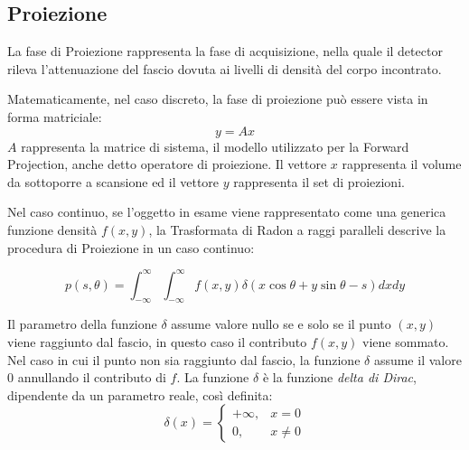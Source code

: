 \documentclass[a4paper,12pt, doubleside]{report}
\begin{document}
            \subsection{Proiezione}
                \par
                    La fase di Proiezione rappresenta la fase di acquisizione, nella quale il detector rileva l'attenuazione del fascio dovuta ai livelli di densità del corpo incontrato.
                \par
                    Matematicamente, nel caso discreto, la fase di proiezione può essere vista in forma matriciale:
                    \begin{equation}
                        y = Ax
                    \end{equation}
                    $A$ rappresenta la matrice di sistema, il modello utilizzato per la Forward Projection, anche detto operatore di proiezione. Il vettore $x$ rappresenta il volume da sottoporre a scansione ed il vettore
                    $y$ rappresenta il set di proiezioni.
                
                \bigskip
                \par
                    Nel caso continuo, se l'oggetto in esame viene rappresentato come una generica funzione densità $f(x,y)$, la Trasformata di Radon a raggi paralleli descrive la procedura di Proiezione in un caso continuo:
                
                    \begin{equation} \label{eq:radon-fwd}
                        p(s,\theta) = \int_{-\infty}^{\infty} \int_{-\infty}^{\infty} f(x,y) \delta(x \cos \theta + y \sin \theta -s) dx dy 
                    \end{equation}
                    
                    Il parametro della funzione $\delta$ assume valore nullo se e solo se il punto $(x,y)$ viene raggiunto dal fascio, in questo caso il contributo $f(x,y)$ viene sommato. Nel caso in cui il punto non sia raggiunto dal fascio, la funzione $\delta$ assume il valore $0$ annullando il contributo di $f$. La funzione $\delta$ è la funzione \textit{delta di Dirac}, dipendente da un parametro reale, così definita:
                    \begin{equation}
                        \delta(x) = \begin{cases} +\infty, & x = 0 \\ 0, & x \ne 0 \end{cases}
                    \end{equation}
                    
\end{document}
